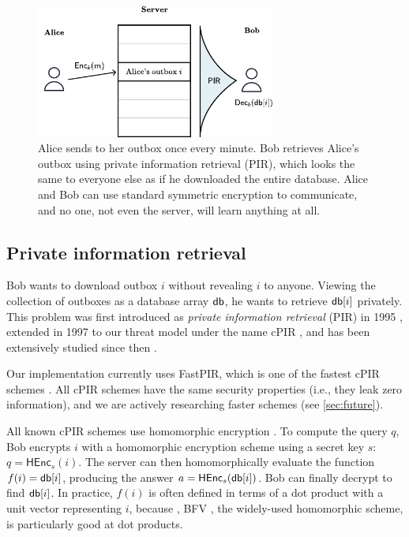 \begin{figure}[htb]
    \centering
    \includegraphics[width=0.7\textwidth]{pirfigure.pdf}
\caption{Alice sends to her outbox once every minute. Bob retrieves Alice's outbox using private information retrieval (PIR), which looks the same to everyone else as if he downloaded the entire database. Alice and Bob can use standard symmetric encryption to communicate, and no one, not even the server, will learn anything at all.}
\end{figure}



\subsection{Private information retrieval}

Bob wants to download outbox $i$ without revealing $i$ to anyone. Viewing the collection of outboxes as a database array $\mathsf{db}$, he wants to retrieve $\mathsf{db}[i]$ privately. This problem was first introduced as \textit{private information retrieval} (PIR) in 1995 \cite{chor1995private}, extended in 1997 to our threat model under the name cPIR \cite{kushilevitz1997replication}, and has been extensively studied since then \cite{melchor2016xpir,angel2018pir, ahmad2021addra}.

Our implementation currently uses FastPIR, which is one of the fastest cPIR schemes \cite{ahmad2021addra}. All cPIR schemes have the same security properties (i.e., they leak zero information), and we are actively researching faster schemes (see \cref{sec:future}).

All known cPIR schemes use homomorphic encryption \cite{gentry2010computing}. To compute the query $q$, Bob encrypts $i$ with a homomorphic encryption scheme using a secret key $s$: $q = \mathsf{HEnc}_s(i)$. The server can then homomorphically evaluate the function $f(i) = \mathsf{db}[i]$, producing the answer $a = \mathsf{HEnc}_s(\mathsf{db}[i])$. Bob can finally decrypt to find $\mathsf{db}[i]$. In practice, $f(i)$ is often defined in terms of a dot product with a unit vector representing $i$, because , BFV \cite{fan2012somewhat}, the widely-used homomorphic scheme, is particularly good at dot products.

